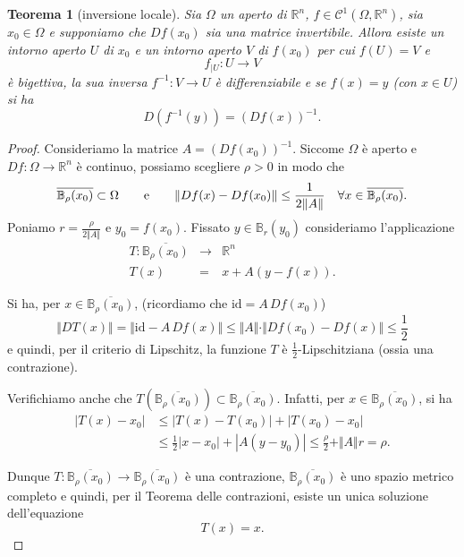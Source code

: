 \documentclass[italian]{article}
\newtheorem{theorem}{Teorema}
\theoremstyle{remark}
\def\text#1{{\mbox{\rm #1}}}            %
\newcommand{\Id}{{\mathrm{id}}}          %
\newcommand{\R}{{\mathbb R}}            %
\newcommand{\CC}{{\mathcal C}}           %
\newcommand{\B}{{\mathbb B}}  %
\def\bea{\begin{eqnarray*}}
\def\eea{\end{eqnarray*}}
\begin{document}
\begin{theorem}[inversione locale]
Sia $\Omega$ un aperto di $\R^n$, $f\in \CC^1(\Omega,\R^n)$,
sia $x_0\in \Omega$ e supponiamo che $Df(x_0)$ 
sia una matrice invertibile.
Allora esiste un intorno aperto $U$ di $x_0$ e un intorno aperto $V$ di $f(x_0)$
per cui $f(U)=V$ e
\[
        f_{|U}\colon U\to V
\]
\`e bigettiva, la sua inversa $f^{-1}\colon V\to U$ \`e differenziabile e se $f(x)=y$ (con $x\in
U$) si ha
\[
        D(f^{-1}(y))=(Df(x))^{-1}.
\]
\end{theorem}
\begin{proof}
Consideriamo la matrice $A=(Df(x_0))^{-1}$. 
Siccome $\Omega$ \`e aperto e $Df\colon
\Omega\to \R^n$ \`e continuo, possiamo scegliere $\rho>0$ in modo che
\[    
    \overline{\B_\rho(x_0)}\subset \Omega
\qquad \text{e} \qquad
        \Vert Df(x)-Df(x_0)\Vert \le \frac{1}{2\Vert A\Vert}
                \quad\forall x\in \overline{\B_\rho(x_0)}.
\]
Poniamo $r=\frac{\rho}{2\Vert A\Vert}$ e
$y_0=f(x_0)$.  Fissato $y\in \B_r(y_0)$
consideriamo l'applicazione
\bea
        T\colon \overline{\B_\rho(x_0)}&\to& \R^n\\
        T(x)&=& x + A(y-f(x)).
\eea

Si ha, per $x\in \overline{\B_\rho(x_0)}$, (ricordiamo che $\Id = A\, Df(x_0)$)
\[
        \Vert DT(x)\Vert=\Vert \Id-A\, Df(x)\Vert \le 
        \Vert A \Vert\cdot\Vert Df(x_0)-Df(x)\Vert
        \le \frac{1}{2}
\]
e quindi, per il criterio di Lipschitz, la funzione $T$ \`e $\frac 1
2$-Lipschitziana (ossia una contrazione).

Verifichiamo anche che $T(\overline{\B_\rho(x_0)})\subset \overline{\B_\rho(x_0)}$.
Infatti, per $x\in \overline{\B_\rho(x_0)}$, si ha
        \begin{align*}
        |T(x)-x_0|&\le |T(x)-T(x_0)|+|T(x_0)-x_0|\\
        &\le \frac 1 2 |x-x_0| + |A (y-y_0)|
        \le \frac \rho 2 + \Vert A\Vert  r
        = \rho.
        \end{align*}

Dunque $T\colon\overline{\B_\rho(x_0)}\to \overline{\B_\rho(x_0)}$ \`e una
contrazione, $\overline{\B_\rho(x_0)}$ \`e uno spazio metrico completo
e quindi, per il Teorema delle contrazioni, 
esiste un unica soluzione dell'equazione
        \[
        T(x)=x.
        \]


\end{proof}
\end{document}
